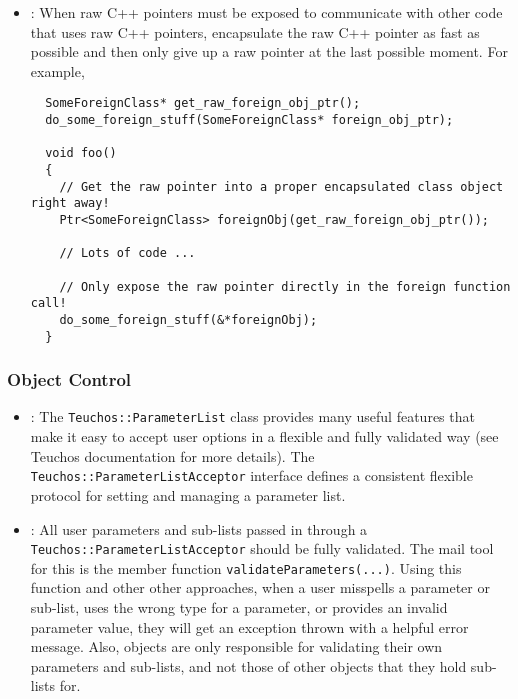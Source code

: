 \begin{itemize}
{}\item\GCGPostponeRawPointers: When raw C++ pointers must be exposed to
communicate with other code that uses raw C++ pointers, encapsulate the raw
C++ pointer as fast as possible and then only give up a raw pointer at the
last possible moment.  For example,

{\small\begin{verbatim}
  SomeForeignClass* get_raw_foreign_obj_ptr();
  do_some_foreign_stuff(SomeForeignClass* foreign_obj_ptr);

  void foo()
  {
    // Get the raw pointer into a proper encapsulated class object right away!
    Ptr<SomeForeignClass> foreignObj(get_raw_foreign_obj_ptr());

    // Lots of code ...

    // Only expose the raw pointer directly in the foreign function call! 
    do_some_foreign_stuff(&*foreignObj);
  }
\end{verbatim}}


\end{itemize}


%
\subsubsection{Object Control}
%


\begin{itemize}


{}\item\GCGTeuchosParamterListAcceptor: The
{}\texttt{Teuchos\-::Parameter\-List} class provides many useful features that
make it easy to accept user options in a flexible and fully validated way (see
Teuchos documentation for more details).  The
{}\texttt{Teuchos\-::Parameter\-List\-Acceptor} interface defines a consistent
flexible protocol for setting and managing a parameter list.


{}\item\GCGTeuchosParamterListValidation: All user parameters and sub-lists
passed in through a {}\texttt{Teuchos\-::Parameter\-List\-Acceptor} should be
fully validated.  The mail tool for this is the member function
{}\texttt{validateParameters(...)}.  Using this function and other other
approaches, when a user misspells a parameter or sub-list, uses the wrong type
for a parameter, or provides an invalid parameter value, they will get an
exception thrown with a helpful error message.  Also, objects are only
responsible for validating their own parameters and sub-lists, and not those of
other objects that they hold sub-lists for.


\end{itemize}


